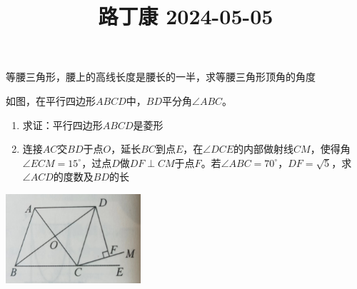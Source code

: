 \documentclass{exam-zh}
\title{路丁康 2024-05-05}\subject{几何 相似/全等三角形}
\begin{document}
        \maketitle
        
        \begin{problem}
        等腰三角形，腰上的高线长度是腰长的一半，求等腰三角形顶角的角度
        \end{problem}
        
        \begin{problem}
        如图，在平行四边形$ABCD$中，$BD$平分角$\angle ABC$。
        \begin{enumerate}
        \item 求证：平行四边形$ABCD$是菱形
        \item 连接$AC$交$BD$于点$O$，延长$BC$到点$E$，在$\angle DCE$的内部做射线$CM$，使得角$\angle ECM=15^\circ$，过点$D$做$DF\perp CM$于点$F$。若$\angle ABC=70^\circ$，$DF=\sqrt{5}$，求$\angle ACD$的度数及$BD$的长
        \end{enumerate}
        \includegraphics[width=5cm]{p1.jpg}
        \end{problem}
        
        
\end{document}
